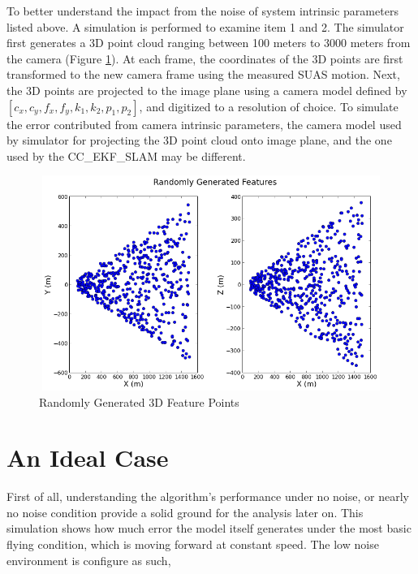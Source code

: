 To better understand the impact from the noise of system intrinsic
parameters listed above. A simulation is performed to examine item 1
and 2. The simulator first generates a 3D point cloud ranging between
100 meters to 3000 meters from the camera (Figure \ref{fig:simfig51}).
At each frame, the coordinates of the 3D points are first transformed
to the new camera frame using the measured SUAS motion. Next, the 3D
points are projected to the image plane using a camera model defined
by $[c_{x}, c_{y}, f_{x}, f_{y}, k_{1}, k_{2}, p_{1}, p_{2}]$, and
digitized to a resolution of choice. To simulate the error contributed
from camera intrinsic parameters, the camera model used by simulator
for projecting the 3D point cloud onto image plane, and the one used
by the CC\_EKF\_SLAM may be different.

\begin{figure}[h]
\centering
\includegraphics[width=12cm, height=7cm]{./Figures/SimulationFigures/Figure51.png}
\caption{Randomly Generated 3D Feature Points}
\label{fig:simfig51}
\end{figure}
\FloatBarrier

\section{An Ideal Case}
First of all, understanding the algorithm's performance under no noise, 
or nearly no noise condition provide a solid ground for the analysis 
later on. This simulation shows how much error the model itself 
generates under the most basic flying condition, which is moving forward 
at constant speed. The low noise environment is configure as such,

